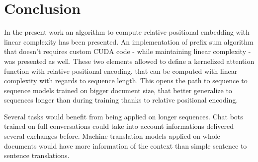\section{Conclusion}

In the present work an algorithm to compute
\citet{shaw2018selfattention} relative
positional embedding with linear complexity has been presented. An implementation of \citet{choromanski2021rethinking} prefix sum algorithm that doesn't requires custom CUDA code - while maintaining linear complexity - was presented as well. These two elements allowed to define a kernelized attention function with relative positional encoding, that can be computed with linear complexity with regards to sequence length. This opens the path to sequence to sequence models trained on bigger document size, that better generalize to sequences longer than during training thanks to relative positional encoding.

Several tasks would benefit from being applied on longer sequences. Chat bots trained on full conversations could take into account informations delivered several exchanges before. Machine translation models applied on whole documents would have more information of the context than simple sentence to sentence translations.

\endinput
